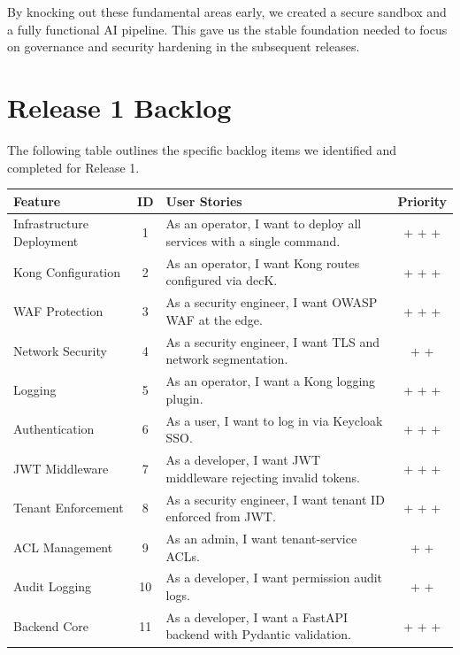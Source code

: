 By knocking out these fundamental areas early, we created a secure sandbox and a fully functional AI pipeline. This gave us the stable foundation needed to focus on governance and security hardening in the subsequent releases.

\section{Release 1 Backlog}

The following table outlines the specific backlog items we identified and completed for Release 1.

\begin{table}[H]
\centering
\renewcommand{\arraystretch}{1.3}
\footnotesize
\begin{tabularx}{\textwidth}{| >{\raggedright\arraybackslash}p{3.5cm} | c | >{\raggedright\arraybackslash}X | c |}
\hline
\rowcolor{rowgray}
\textbf{Feature} & \textbf{ID} & \textbf{User Stories} & \textbf{Priority} \\
\hline
Infrastructure Deployment & 1 & As an operator, I want to deploy all services with a single command. & + + + \\
\hline
Kong Configuration & 2 & As an operator, I want Kong routes configured via decK. & + + + \\
\hline
WAF Protection & 3 & As a security engineer, I want OWASP WAF at the edge. & + + + \\
\hline
Network Security & 4 & As a security engineer, I want TLS and network segmentation. & + + \\
\hline
Logging & 5 & As an operator, I want a Kong logging plugin. & + + + \\
\hline
Authentication & 6 & As a user, I want to log in via Keycloak SSO. & + + + \\
\hline
JWT Middleware & 7 & As a developer, I want JWT middleware rejecting invalid tokens. & + + + \\
\hline
Tenant Enforcement & 8 & As a security engineer, I want tenant ID enforced from JWT. & + + + \\
\hline
ACL Management & 9 & As an admin, I want tenant-service ACLs. & + + \\
\hline
Audit Logging & 10 & As a developer, I want permission audit logs. & + + \\
\hline
Backend Core & 11 & As a developer, I want a FastAPI backend with Pydantic validation. & + + + \\

\end{tabularx}
\end{table}
